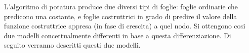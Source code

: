 L'algoritmo di potatura produce due diversi tipi di foglie: foglie ordinarie che predicono una costante, e foglie costruttrici in grado di predire il valore della funzione costruttrice appresa (in fase di crescita) a quel nodo.
Si ottengono cosi due modelli concettualmente differenti in base a questa differenziazione. Di seguito verranno descritti questi due modelli.

